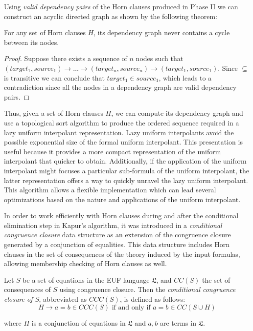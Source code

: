 Using \emph{valid dependency pairs} of the Horn clauses 
produced in Phase II
we can construct an acyclic directed graph as shown 
by the following theorem:

\begin{theorem}
  For any set of Horn clauses $H$, its dependency graph 
  never contains a cycle between its nodes.
\end{theorem}

\begin{proof}
  Suppose there exists a sequence of $n$ nodes such that 
  $(target_1, source_1) \rightarrow \dots 
  \rightarrow (target_n, source_n) \rightarrow (target_1, source_1)$.
  Since $\subseteq$ is transitive we can conclude that 
  $target_1 \in source_1$, which leads to a contradiction since all
  the nodes in a dependency graph are valid dependency pairs.
\end{proof}

Thus, given a set of Horn clauses $H$, we can compute its
dependency graph and use a topological sort algorithm to 
produce the ordered sequence required in a lazy uniform 
interpolant representation. 
Lazy uniform interpolants avoid the 
possible exponential size of the 
formal uniform interpolant. This presentation 
is useful because it provides a more compact
representation of the uniform interpolant that 
quicker to obtain.
Additionally, if the application of the uniform interpolant 
might focuses a particular sub-formula of 
the uniform interpolant, the
latter representation offers a way to quickly unravel 
the lazy uniform interpolant. This algorithm 
allows a flexible implementation 
which can lead several optimizations
based on the nature and applications of the uniform 
interpolant.

In order to work efficiently with Horn clauses 
during and after the conditional elimination step
in Kapur's algorithm, it was 
introduced in \cite{KAPUR2019} a 
\emph{conditional congruence closure} data structure as 
an extension of the congruence closure
generated by a conjunction of equalities.
This data structure includes Horn clauses in the set
of consequences of the theory induced by
the input formulas, allowing membership checking 
of Horn clauses as well. 

\begin{definition}
  Let $S$ be a set of equations in the EUF language
  $\mathfrak{L}$, and
  $CC(S)$ the set of consequences of $S$ using congruence
  closure. Then the \emph{conditional congruence closure of S},
  abbreviated as $CCC(S)$,
  is defined as follows:
  \begin{equation*}
    H \rightarrow a = b \in CCC(S) \text{ if and only if } 
    a = b \in CC(S \cup H)
  \end{equation*}

  where $H$ is a conjunction of equations in $\mathfrak{L}$ 
  and $a,b$ are terms in $\mathfrak{L}$.
\end{definition}


